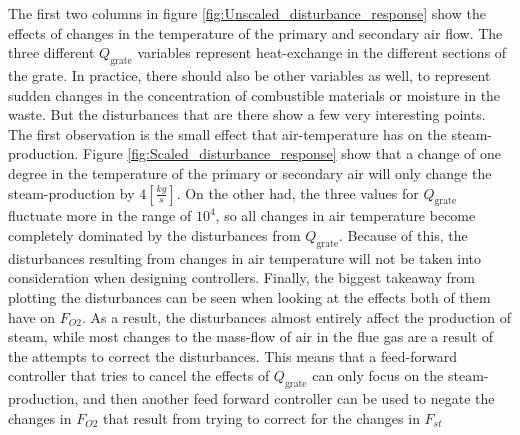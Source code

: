 The first two columns in figure \ref{fig:Unscaled_disturbance_response} show the effects of changes in the temperature of the primary and secondary air flow. The three different $Q_{\text{grate}}$ variables represent heat-exchange in the different sections of the grate. In practice, there should also be other variables as well, to represent sudden changes in the concentration of combustible materials or moisture in the waste. But the disturbances that are there show a few very interesting points. The first observation is the small effect that air-temperature has on the steam-production. Figure \ref{fig:Scaled_disturbance_response} show that a change of one degree in the temperature of the primary or secondary air will only change the steam-production by $4 \left[ \frac{kg}{s} \right]$. On the other had, the three values for $Q_{\text{grate}}$ fluctuate more in the range of $10^4$, so all changes in air temperature become completely dominated by the disturbances from $Q_{\text{grate}}$. Because of this, the disturbances resulting from changes in air temperature will not be taken into consideration when designing controllers.
\noindent
Finally, the biggest takeaway from plotting the disturbances can be seen when looking at the effects both of them have on $F_{O2}$. As a result, the disturbances almost entirely affect the production of steam, while most changes to the mass-flow of air in the flue gas are a result of the attempts to correct the disturbances. This means that a feed-forward controller that tries to cancel the effects of $Q_{\text{grate}}$ can only focus on the steam-production, and then another feed forward controller can be used to negate the changes in $F_{O2}$ that result from trying to correct for the changes in $F_{st}$


\noindent


